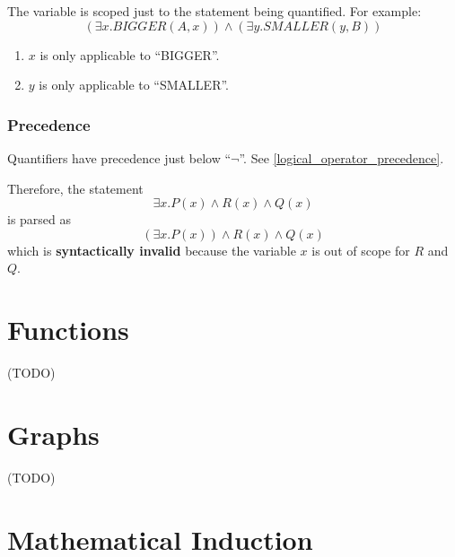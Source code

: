 \documentclass[12pt, letterpaper, oneside]{book}
\begin{document}
The variable is scoped just to the statement being quantified. For example:
\[(\exists x. BIGGER(A, x)) \land (\exists y. SMALLER(y, B))\]

\begin{enumerate}
  \item $x$ is only applicable to ``BIGGER''.
  \item $y$ is only applicable to ``SMALLER''.
\end{enumerate}

\subsection{Precedence}

Quantifiers have precedence just below ``$\lnot$''. See
\ref{logical_operator_precedence}.

Therefore, the statement \[\exists x. P(x) \land R(x) \land Q(x)\] is parsed as
\[(\exists x. P(x)) \land R(x) \land Q(x)\] which is \textbf{syntactically
  invalid} because the variable $x$ is out of scope for $R$ and $Q$.



%
%

\chapter{Functions}

 (TODO)

%
%

\chapter{Graphs}

 (TODO)

%
%

\chapter{Mathematical Induction}
\end{document}
